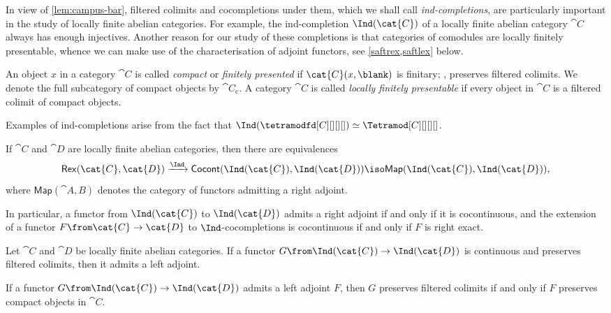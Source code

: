 In view of \cref{lem:campus-bar},
filtered colimits and cocompletions under them,
which we shall call \emph{ind-completions},
are particularly important in the study of locally finite abelian categories.
For example, the ind-completion \(\Ind(\cat{C})\) of a locally finite abelian category \(\cat{C}\) always has enough injectives.
Another reason for our study of these completions
is that categories of comodules are locally finitely presentable,
whence we can make use of the characterisation of adjoint functors, see \cref{saftrex,saftlex} below.

\begin{definition}\label{def:lfp-category}
  An object \(x\) in a category \(\cat{C}\) is called \emph{compact}
  or \emph{finitely presented}
  if \(\cat{C}(x, \blank)\) is finitary; \ie, preserves filtered colimits.
  We denote the full subcategory of compact objects by \(\cat{C}_{\mathrm{c}}\).
  A category \(\cat{C}\) is called \emph{locally finitely presentable}
  if every object in \(\cat{C}\) is a filtered colimit of compact objects.
\end{definition}

Examples of ind-completions arise from the fact that
 \(\Ind(\tetramodfd[C][][][]) \simeq \Tetramod[C][][][]\).

\begin{proposition}\label{saftrex}
  If \(\cat{C}\) and \(\cat{D}\) are locally finite abelian categories,
  then there are equivalences
  \[
    \mathsf{Rex}(\cat{C},\cat{D})
    \xrightarrow{\Ind} \mathsf{Cocont}(\Ind(\cat{C}), \Ind(\cat{D}))
    \iso \mathsf{Map}(\Ind(\cat{C}), \Ind(\cat{D})),
  \]
  where \(\mathsf{Map}(\cat{A,B})\) denotes the category of functors admitting a right adjoint.

  In particular, a functor from \(\Ind(\cat{C})\) to \(\Ind(\cat{D})\) admits a right adjoint if and only if it is cocontinuous,
  and the extension of a functor \(F\from \cat{C} \to \cat{D}\) to \(\Ind\)\hyp{}cocompletions is cocontinuous if and only if \(F\) is right exact.
\end{proposition}

\begin{proposition}\label{saftlex}
  Let \(\cat{C}\) and \(\cat{D}\) be locally finite abelian categories.
  If a functor \(G\from \Ind(\cat{C}) \to \Ind(\cat{D})\) is continuous and preserves filtered colimits, then it admits a left adjoint.

  If a functor \(G\from \Ind(\cat{C}) \to \Ind(\cat{D})\) admits a left adjoint \(F\),
  then \(G\) preserves filtered colimits if and only if \(F\) preserves compact objects in \(\cat{C}\).
\end{proposition}


